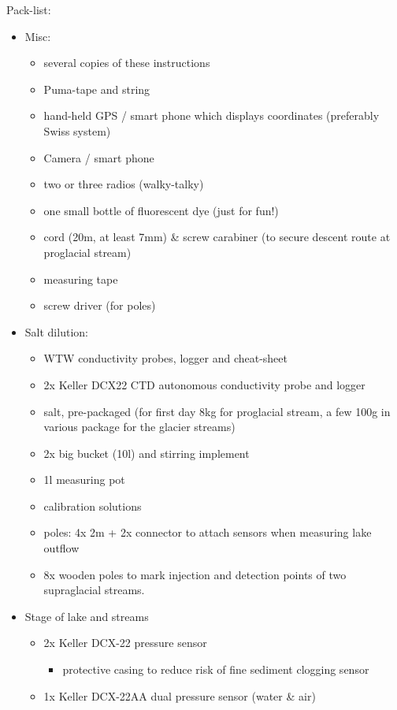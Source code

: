 \documentclass[DIV=15,halfparskip,11pt,headinclude]{scrartcl}
\begin{document}
Pack-list:\\
\begin{itemize}
\item Misc:
  \begin{itemize}
  \item several copies of these instructions
  \item Puma-tape and string
  \item hand-held GPS / smart phone which displays coordinates
    (preferably Swiss system)
  \item Camera / smart phone
  \item two or three radios (walky-talky)
  \item one small bottle of fluorescent dye (just for fun!)
  \item cord (20m, at least 7mm) \& screw carabiner (to secure descent route at
    proglacial stream)
  \item measuring tape
  \item screw driver (for poles)
  \end{itemize}
\item Salt dilution:
  \begin{itemize}
  \item WTW conductivity probes, logger and cheat-sheet
  \item 2x Keller DCX22 CTD autonomous conductivity probe and logger
  \item salt, pre-packaged (for first day 8kg for proglacial stream, a
    few 100g in various package for the glacier streams)
  \item 2x big bucket (10l) and stirring implement
  \item 1l measuring pot
  \item calibration solutions
  \item poles: 4x 2m + 2x connector to attach sensors when measuring
    lake outflow
  \item 8x wooden poles to mark injection and
    detection points of two supraglacial streams.
  \end{itemize}
\item Stage of lake and streams
  \begin{itemize}
  \item 2x Keller DCX-22 pressure sensor
  \begin{itemize}
    \item protective casing to
      reduce risk of fine sediment clogging sensor
    \end{itemize}
  \item 1x Keller DCX-22AA dual pressure sensor (water \& air)

\end{itemize}
\end{itemize}
\end{document}
